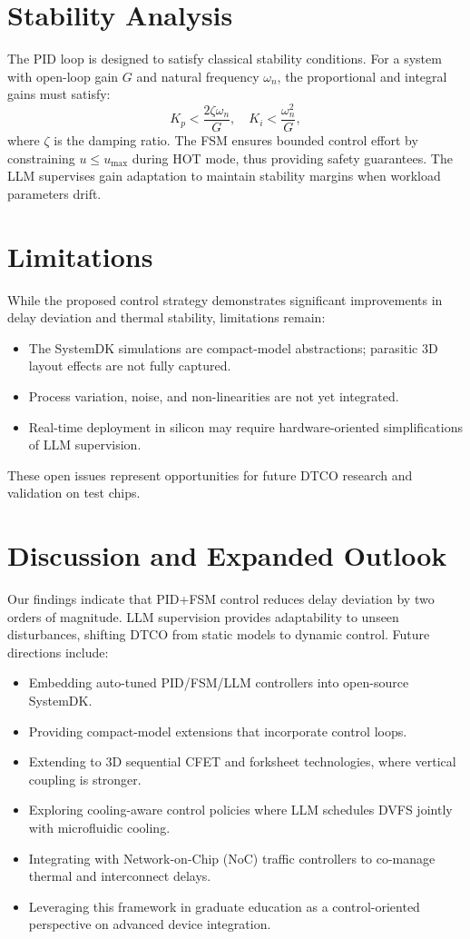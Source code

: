 \documentclass[conference]{IEEEtran}
\begin{document}
\section{Stability Analysis}
The PID loop is designed to satisfy classical stability conditions.
For a system with open-loop gain $G$ and natural frequency $\omega_n$,
the proportional and integral gains must satisfy:
\begin{equation}
K_p < \frac{2\zeta\omega_n}{G}, \quad
K_i < \frac{\omega_n^2}{G},
\end{equation}
where $\zeta$ is the damping ratio.
The FSM ensures bounded control effort by constraining
$u \leq u_{\max}$ during HOT mode,
thus providing safety guarantees.
The LLM supervises gain adaptation to maintain stability margins
when workload parameters drift.

\section{Limitations}
While the proposed control strategy demonstrates significant improvements
in delay deviation and thermal stability, limitations remain:
\begin{itemize}
  \item The SystemDK simulations are compact-model abstractions; parasitic 3D layout effects are not fully captured.
  \item Process variation, noise, and non-linearities are not yet integrated.
  \item Real-time deployment in silicon may require hardware-oriented simplifications of LLM supervision.
\end{itemize}
These open issues represent opportunities for future DTCO research and validation on test chips.

\section{Discussion and Expanded Outlook}
Our findings indicate that PID+FSM control reduces delay deviation
by two orders of magnitude. LLM supervision provides adaptability to
unseen disturbances, shifting DTCO from static models to dynamic control.
Future directions include:
\begin{itemize}
  \item Embedding auto-tuned PID/FSM/LLM controllers into open-source SystemDK.
  \item Providing compact-model extensions that incorporate control loops.
  \item Extending to 3D sequential CFET and forksheet technologies,
  where vertical coupling is stronger.
  \item Exploring cooling-aware control policies where LLM schedules
  DVFS jointly with microfluidic cooling.
  \item Integrating with Network-on-Chip (NoC) traffic controllers
  to co-manage thermal and interconnect delays.
  \item Leveraging this framework in graduate education as a control-oriented
  perspective on advanced device integration.
\end{itemize}
\end{document}
